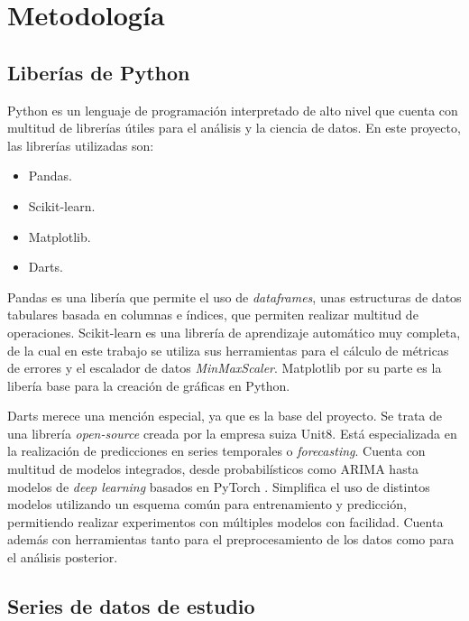 \chapter{Metodología}\label{cap3}

\section{Liberías de Python}

Python \cite{python} es un lenguaje de programación interpretado de alto nivel que cuenta con multitud de librerías útiles para el análisis y la ciencia de datos. En este proyecto, las librerías utilizadas son:

\begin{itemize}
	\item Pandas.
	\item Scikit-learn.
	\item Matplotlib.
	\item Darts.
\end{itemize}

Pandas \cite{pandas} es una libería que permite el uso de \textit{dataframes}, unas estructuras de datos tabulares basada en columnas e índices, que permiten realizar multitud de operaciones. Scikit-learn \cite{scikit-learn} es una librería de aprendizaje automático muy completa, de la cual en este trabajo se utiliza sus herramientas para el cálculo de métricas de errores y el escalador de datos \textit{MinMaxScaler}. Matplotlib \cite{matplotlib} por su parte es la libería base para la creación de gráficas en Python.

Darts \cite{darts} merece una mención especial, ya que es la base del proyecto. Se trata de una librería \textit{open-source} creada por la empresa suiza Unit8. Está especializada en la realización de predicciones en series temporales o \textit{forecasting}. Cuenta con multitud de modelos integrados, desde probabilísticos como ARIMA hasta modelos de \textit{deep learning} basados en PyTorch \cite{pytorch}. Simplifica el uso de distintos modelos utilizando un esquema común para entrenamiento y predicción, permitiendo realizar experimentos con múltiples modelos con facilidad. Cuenta además con herramientas tanto para el preprocesamiento de los datos como para el análisis posterior.

\section{Series de datos de estudio}

